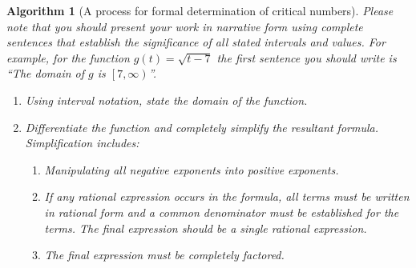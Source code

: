 \documentclass[12pt,]{book}
\theoremstyle{plain}
\newtheorem{algorithm}[theorem]{Algorithm}
\theoremstyle{definition}
\numberwithin{equation}{section}
\newcommand{\fe}[2]{#1\mathopen{}\left(#2\right)\mathclose{}}
\newcommand{\cointerval}[2]{\left[\left.#1,#2\right)\right.}
\begin{document}
\begin{algorithm}[A process for formal determination of critical numbers]\label{algorithm-find-critical-numbers}
Please note that you should present your work in narrative form using complete sentences that establish the significance of all stated intervals and values.  For example, for the function \(\fe{g}{t}=\sqrt{t-7}\) the first sentence you should write is ``The domain of \(g\) is \(\cointerval{7}{\infty}\)''.%
\begin{enumerate}
\item{}Using interval notation, state the domain of the function.\item{}Differentiate the function and completely simplify the resultant formula.  Simplification includes:
                    \begin{enumerate}
\item{}Manipulating all negative exponents into positive exponents.\item{}If any rational expression occurs in the formula, all terms must be written in rational form and a common denominator must be established for the terms.  The final expression should be a single rational expression.\item{}The final expression must be completely factored.\end{enumerate}


\end{enumerate}
\end{algorithm}
\end{document}
